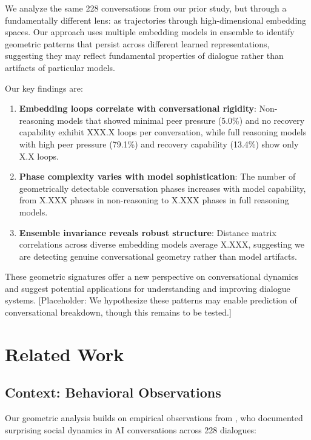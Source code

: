 \documentclass[11pt,letterpaper]{article}
\newcommand{\totalConversations}{228}
\newcommand{\fullReasoningPeerPressure}{79.1\%}
\newcommand{\nonReasoningPeerPressure}{5.0\%}
\newcommand{\fullReasoningRecovery}{13.4\%}
\newcommand{\fullPhaseCount}{X.XXX}
\newcommand{\nonPhaseCount}{X.XXX}
\newcommand{\fullLoops}{X.X}
\newcommand{\nonLoops}{XXX.X}
\newcommand{\ensembleDistanceCorr}{X.XXX}
\begin{document}
We analyze the same \totalConversations{} conversations from our prior study, but through a fundamentally different lens: as trajectories through high-dimensional embedding spaces. Our approach uses multiple embedding models in ensemble to identify geometric patterns that persist across different learned representations, suggesting they may reflect fundamental properties of dialogue rather than artifacts of particular models.

Our key findings are:
\begin{enumerate}
\item \textbf{Embedding loops correlate with conversational rigidity}: Non-reasoning models that showed minimal peer pressure (\nonReasoningPeerPressure{}) and no recovery capability exhibit \nonLoops{} loops per conversation, while full reasoning models with high peer pressure (\fullReasoningPeerPressure{}) and recovery capability (\fullReasoningRecovery{}) show only \fullLoops{} loops.

\item \textbf{Phase complexity varies with model sophistication}: The number of geometrically detectable conversation phases increases with model capability, from \nonPhaseCount{} phases in non-reasoning to \fullPhaseCount{} phases in full reasoning models.

\item \textbf{Ensemble invariance reveals robust structure}: Distance matrix correlations across diverse embedding models average \ensembleDistanceCorr{}, suggesting we are detecting genuine conversational geometry rather than model artifacts.
\end{enumerate}

These geometric signatures offer a new perspective on conversational dynamics and suggest potential applications for understanding and improving dialogue systems. [Placeholder: We hypothesize these patterns may enable prediction of conversational breakdown, though this remains to be tested.]

\section{Related Work}

\subsection{Context: Behavioral Observations}

Our geometric analysis builds on empirical observations from \citet{garcia2025peer}, who documented surprising social dynamics in AI conversations across \totalConversations{} dialogues:
\end{document}

